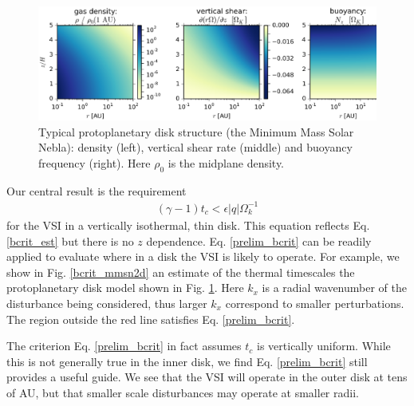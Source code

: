 \documentclass[iop]{emulateapj}
\begin{document}
\begin{figure}
  \includegraphics[width=\linewidth]{figures/rhoshearNz}
  \caption{Typical protoplanetary disk structure (the Minimum Mass
    Solar Nebla): density (left), vertical shear rate (middle) and
    buoyancy frequency (right). Here $\rho_0$ is the midplane density.  
    \label{eqm_structure} 
  }
\end{figure}


Our central result is the requirement 
\begin{align}\label{prelim_bcrit}
  (\gamma - 1)t_c < \epsilon |q| \Omega_k^{-1}
\end{align}   
for the VSI in a vertically isothermal, thin disk. This equation
reflects Eq. \ref{bcrit_est} but there is no $z$ dependence. 
Eq. \ref{prelim_bcrit} can be 
readily applied to evaluate where in a disk the VSI is likely to
operate. For example, we show in Fig. \ref{bcrit_mmsn2d} an estimate
of the thermal timescales the protoplanetary disk model shown in
Fig. \ref{eqm_structure}. Here $k_x$ is a radial
wavenumber of the disturbance being considered, thus larger $k_x$
correspond to smaller perturbations. The region outside the red line
satisfies Eq. \ref{prelim_bcrit}. 

The criterion Eq. \ref{prelim_bcrit} in fact
assumes $t_c$ is vertically uniform. While this is not generally true
in the inner disk, we find Eq. \ref{prelim_bcrit} still provides a
useful guide. We see that the VSI will operate in the outer 
disk at tens of AU, but that smaller scale disturbances may operate at
smaller radii. 
\end{document}
